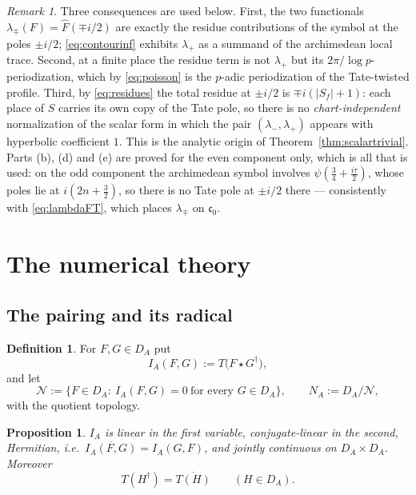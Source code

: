 \documentclass[11pt]{amsart}
\newtheorem{proposition}[theorem]{Proposition}
\theoremstyle{definition}
\newtheorem{definition}[theorem]{Definition}
\theoremstyle{remark}
\newtheorem{remark}[theorem]{Remark}
\newcommand{\DA}{D_A}
\newcommand{\Nrad}{\mathcal N}
\begin{document}
\begin{remark}\label{rem:MLconseq}
Three consequences are used below.  First, the two functionals
$\lambda_{\mp}(F)=\widehat F(\mp i/2)$ are exactly the residue contributions of
the symbol at the poles $\pm i/2$; \eqref{eq:contourinf} exhibits $\lambda_+$
as a summand of the archimedean local trace.  Second, at a finite place the
residue term is not $\lambda_+$ but its $2\pi/\log p$-periodization, which by
\eqref{eq:poisson} is the $p$-adic periodization of the Tate-twisted profile.
Third, by \eqref{eq:residues} the total residue at $\pm i/2$ is
$\mp i(|S_f|+1)$: each place of $S$ carries its own copy of the Tate pole, so
there is no \emph{chart-independent} normalization of the scalar form in which
the pair $(\lambda_-,\lambda_+)$ appears with hyperbolic coefficient $1$.  This
is the analytic origin of Theorem~\ref{thm:scalartrivial}.  Parts (b), (d) and
(e) are proved for the even component only, which is all that is used: on the
odd component the archimedean symbol involves $\psi(\tfrac34+\tfrac{i\tau}2)$,
whose poles lie at $i(2n+\tfrac32)$, so there is no Tate pole at $\pm i/2$
there --- consistently with \eqref{eq:lambdaFT}, which places $\lambda_{\mp}$
on $\mathfrak c_0$.
\end{remark}

\section{The numerical theory}\label{sec:numerical}

\subsection{The pairing and its radical}

\begin{definition}\label{def:pairing}
For $F,G\in\DA$ put
\begin{equation}\label{eq:IA}
I_A(F,G):=T\bigl(F\star G^{\dagger}\bigr),
\end{equation}
and let
\begin{equation}\label{eq:radical}
\Nrad:=\bigl\{F\in\DA:\ I_A(F,G)=0\ \text{for every }G\in\DA\bigr\},
\qquad N_A:=\DA/\Nrad,
\end{equation}
with the quotient topology.
\end{definition}

\begin{proposition}\label{prop:bilin}
$I_A$ is linear in the first variable, conjugate-linear in the second,
Hermitian, i.e.\ $\overline{I_A(F,G)}=I_A(G,F)$, and jointly continuous on
$\DA\times\DA$.  Moreover
\begin{equation}\label{eq:daggerreal}
T(H^{\dagger})=\overline{T(H)}\qquad(H\in\DA).
\end{equation}
\end{proposition}
\end{document}
